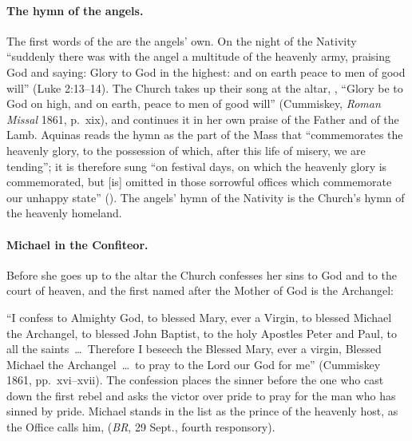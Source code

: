 \paragraph{The hymn of the angels.} The first words of the 
are the angels' own. On the night of the Nativity ``suddenly there was
with the angel a multitude of the heavenly army, praising God and saying:
Glory to God in the highest: and on earth peace to men of good will''
(Luke 2:13--14). The Church takes up their song at the altar,
,
``Glory be to God on high, and on earth, peace to men of good will''
(Cummiskey, \emph{Roman Missal} 1861, p.~xix), and continues it in her own
praise of the Father and of the Lamb. Aquinas reads the hymn as the part of
the Mass that ``commemorates the heavenly glory, to the possession of
which, after this life of misery, we are tending''; it is therefore sung
``on festival days, on which the heavenly glory is commemorated, but [is]
omitted in those sorrowful offices which commemorate our unhappy state''
(). The angels' hymn of the Nativity is the
Church's hymn of the heavenly homeland.

\paragraph{Michael in the Confiteor.} Before she goes up to the altar the
Church confesses her sins to God and to the court of heaven, and the first
named after the Mother of God is the Archangel:
\begin{quote}
\end{quote}
``I confess to Almighty God, to blessed Mary, ever a Virgin, to blessed
Michael the Archangel, to blessed John Baptist, to the holy Apostles Peter
and Paul, to all the saints~\dots\ Therefore I beseech the Blessed Mary,
ever a virgin, Blessed Michael the Archangel~\dots\ to pray to the Lord
our God for me'' (Cummiskey 1861, pp.~xvi--xvii). The confession places
the sinner before the one who cast down the first rebel and asks the
victor over pride to pray for the man who has sinned by pride. Michael
stands in the list as the prince of the heavenly host, as the Office
calls him,  (\emph{BR}, 29 Sept.,
fourth responsory).

